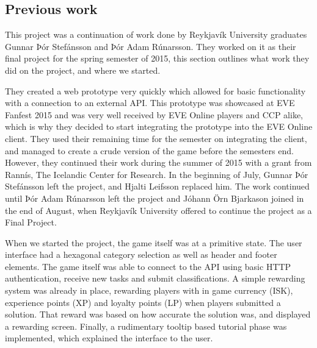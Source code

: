 \subsection{Previous work}
	This project was a continuation of work done by Reykjavík University graduates Gunnar Þór Stefánsson and Þór Adam Rúnarsson. They worked on it as their final project for the spring semester of 2015, this section outlines what work they did on the project, and where we started. 

	They created a web prototype very quickly which allowed for basic functionality with a connection to an external API. This prototype was showcased at EVE Fanfest 2015 and was very well received by EVE Online players and CCP alike, which is why they decided to start integrating the prototype into the EVE Online client. They used their remaining time for the semester on integrating the client, and managed to create a crude version of the game before the semesters end.
	However, they continued their work during the summer of 2015 with a grant from Rannís, The Icelandic Center for Research. In the beginning of July, Gunnar Þór Stefánsson left the project, and Hjalti Leifsson replaced him. The work continued until Þór Adam Rúnarsson left the project and Jóhann Örn Bjarkason joined in the end of August, when Reykjavík University offered to continue the project as a Final Project.

	When we started the project, the game itself was at a primitive state. The user interface had a hexagonal category selection as well as header and footer elements. The game itself was able to connect to the API using basic HTTP authentication, receive new tasks and submit classifications. A simple rewarding system was already in place, rewarding players with in game currency (ISK), experience points (XP) and loyalty points (LP) when players submitted a solution. That reward was based on how accurate the solution was, and displayed a rewarding screen. Finally, a rudimentary tooltip based tutorial phase was implemented, which explained the interface to the user.

